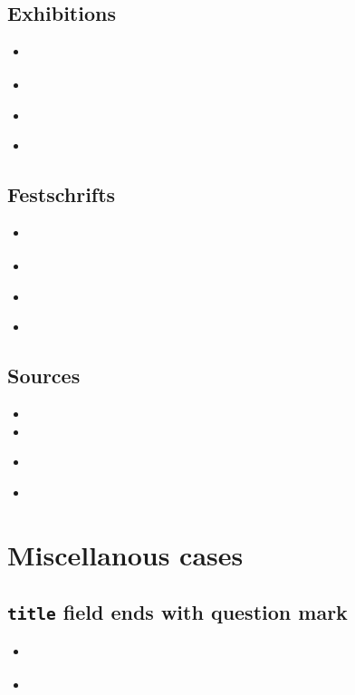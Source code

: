 \documentclass[a4paper,12pt]{scrartcl}
\newcommand*{\Feld}[1]{\texttt{#1}}
\begin{document}
\subsection{Exhibitions}
\begin{itemize}
    \item\cite{schaedler:1999}%
    \item{}%
    \item\cite{oberlechner:1999}%
    \item{}%
\end{itemize}


\subsection{Festschrifts}
\begin{itemize}
    \item\cite{kronsbein:siepen:2015}%
    \item{}%
    \item\cites{auler:hiller:2015a}%
    \item{}%
\end{itemize}

\subsection{Sources}
\begin{itemize}
    \item{}
    \item{}
    \item\cites{test::source}%
    \item{}%
\end{itemize}

\section{Miscellanous cases}

\subsection{\Feld{title} field ends with question mark}
\begin{itemize}
    \item\cite{edenmo:1997}%
    \item{}
\end{itemize}
\end{document}
